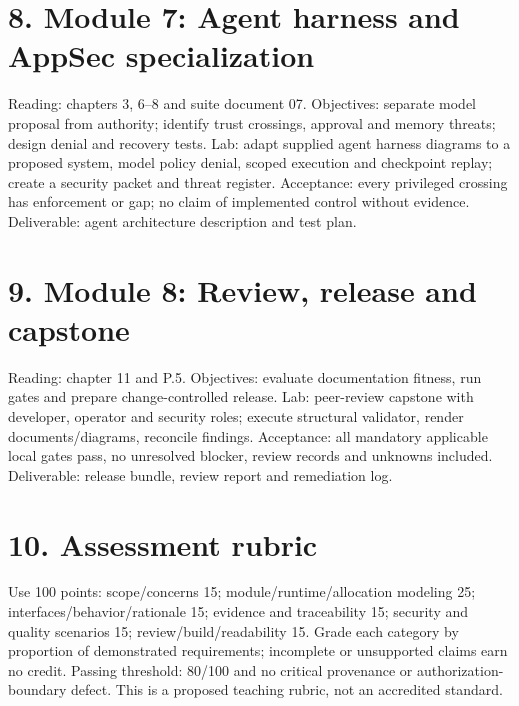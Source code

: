 \documentclass[11pt,letterpaper]{article}
\begin{document}
\section*{8. Module 7: Agent harness and AppSec specialization}
Reading: chapters 3, 6--8 and suite document 07. Objectives: separate model proposal from authority; identify trust crossings, approval and memory threats; design denial and recovery tests. Lab: adapt supplied agent harness diagrams to a proposed system, model policy denial, scoped execution and checkpoint replay; create a security packet and threat register. Acceptance: every privileged crossing has enforcement or gap; no claim of implemented control without evidence. Deliverable: agent architecture description and test plan.\par\smallskip
\section*{9. Module 8: Review, release and capstone}
Reading: chapter 11 and P.5. Objectives: evaluate documentation fitness, run gates and prepare change-controlled release. Lab: peer-review capstone with developer, operator and security roles; execute structural validator, render documents/diagrams, reconcile findings. Acceptance: all mandatory applicable local gates pass, no unresolved blocker, review records and unknowns included. Deliverable: release bundle, review report and remediation log.\par\smallskip
\section*{10. Assessment rubric}
Use 100 points: scope/concerns 15; module/runtime/allocation modeling 25; interfaces/behavior/rationale 15; evidence and traceability 15; security and quality scenarios 15; review/build/readability 15. Grade each category by proportion of demonstrated requirements; incomplete or unsupported claims earn no credit. Passing threshold: 80/100 and no critical provenance or authorization-boundary defect. This is a proposed teaching rubric, not an accredited standard.\par\smallskip
\end{document}
